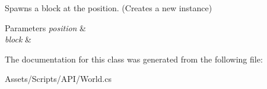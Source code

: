 Spawns a block at the position. (Creates a new instance) 


\begin{DoxyParams}{Parameters}
{\em position} & \\
\hline
{\em block} & \\
\hline
\end{DoxyParams}


The documentation for this class was generated from the following file\+:\begin{DoxyCompactItemize}
\item 
Assets/\+Scripts/\+A\+P\+I/World.\+cs\end{DoxyCompactItemize}
